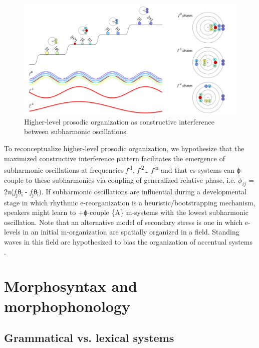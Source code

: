  
\begin{figure}
\includegraphics[width=\textwidth]{figures/Tilsen-img64.png}
\caption{Higher-level prosodic organization as constructive interference between subharmonic oscillations.}
\label{fig:4:14}
\end{figure}
 

  To reconceptualize higher-level prosodic organization, we hypothesize that the maximized constructive interference pattern facilitates the emergence of subharmonic oscillations at frequencies \textit{f}\textsuperscript{{}-1}, \textit{f}\textsuperscript{{}-2}… \textit{f}\textsuperscript{{}-n} and that cs-systems can ϕ-couple to these subharmonics via coupling of generalized relative phase, i.e. $\tilde{\phi}_{ij}$ = 2π(\textit{f}\textsubscript{j}θ\textsubscript{i} - \textit{f}\textsubscript{j}θ\textsubscript{i}). If subharmonic oscillations are influential during a developmental stage in which rhythmic e-reorganization is a heuristic/bootstrapping mechanism, speakers might learn to +ϕ-couple \{A\} m-systems with the lowest subharmonic oscillation. Note that an alternative model of secondary stress is one in which e-levels in an initial m-organization are spatially organized in a field. Standing waves in this field are hypothesized to bias the organization of accentual systems \citep{Tilsen2018b}.

\section{Morphosyntax and morphophonology}
\rohead{\headmark}
\subsection{Grammatical vs. lexical systems}

